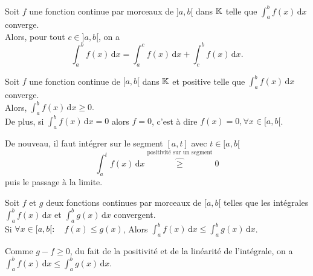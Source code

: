 \documentclass{book}
\begin{document}
\begin{Proposition}
Soit $f$ une fonction continue par morceaux de $]a,b[$ dans $\mathbb{K}$ telle que $\int_a^b f(x)\,\mathrm dx$ converge.\\
Alors, pour tout $c\in ]a,b[$, on a $$ \int_a^b f(x)\,\mathrm dx =\int_a^c f(x)\,\mathrm dx+\int_c^b f(x)\,\mathrm dx.$$
\end{Proposition}
\begin{Proposition}[Positivité]
Soit $f$ une fonction continue de $[a,b[$ dans $\mathbb{K}$ et positive telle que $\int_a^b f(x)\,\mathrm dx$ converge.\\
Alors, $ \int_a^b f(x)\,\mathrm dx \geq 0.$\\
De plus, si  $ \int_a^b f(x)\,\mathrm dx =0$ alors $f=0$, c'est à dire $f(x)=0,\forall x \in [a,b[$.
\end{Proposition}
\begin{Demonstration}
De nouveau, il faut intégrer sur le segment $[a, t]$ avec $t\in [a,b [$  
$$\int_a^t  f(x)\,\mathrm dx\overbrace{\geq}^{\text{positivité sur un segment}} 0$$
puis le passage à la limite.
\end{Demonstration}
\begin{Corollaire}[Croissance]
Soit $f$ et $g$ deux fonctions continues par morceaux de $[a,b[$ telles que les intégrales $\int_a^b f(x)\,\mathrm dx$ et $\int_a^b g(x)\,\mathrm dx$ convergent.\\
Si $\forall x\in [a,b[:\quad  f(x)\leq  g(x)$,
Alors $\int_a^b f(x)\,\mathrm dx \leq  \int_a^b g(x)\,\mathrm dx$.
\end{Corollaire}
\begin{Demonstration}
Comme $g-f\geq 0$, du fait de la positivité et de la linéarité de l'intégrale, on  a  $\int_a^b f(x)\,\mathrm dx \leq  \int_a^b g(x)\,\mathrm dx$.
\end{Demonstration}
\end{document}

